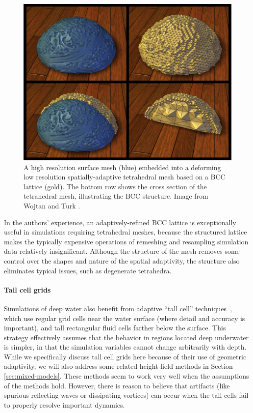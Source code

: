 \begin{figure}[t]
\centering
\includegraphics[width=\linewidth]{images/starAdaptivity-cgf2016/WT2008_BCC.png}
\caption{A high resolution surface mesh (blue) embedded into a deforming low resolution spatially-adaptive tetrahedral mesh based on a BCC lattice (gold). The bottom row shows the cross section of the tetrahedral mesh, illustrating the BCC structure. Image from Wojtan and Turk \cite{Wojtan2008}.}
\label{fig:WT_BCC}
\end{figure}

In the authors' experience, an adaptively-refined BCC lattice is exceptionally useful in simulations requiring tetrahedral meshes, because the structured lattice makes the typically expensive operations of remeshing and resampling simulation data relatively insignificant. Although the structure of the mesh removes some control over the shapes and nature of the spatial adaptivity, the structure also eliminates typical issues, such as degenerate tetrahedra.

\paragraph*{Tall cell grids} Simulations of deep water also benefit from adaptive ``tall cell'' techniques~\cite{Irving2006,Chentanez2011}, which use regular grid cells near the water surface (where detail and accuracy is important), and tall rectangular fluid cells farther below the surface. This strategy effectively assumes that the behavior in regions located deep underwater is simpler, in that the simulation variables cannot change arbitrarily with depth. While we specifically discuss tall cell grids here because of their use of geometric adaptivity, we will also address some related height-field methods in Section \ref{sec:mixed-models}. These methods seem to work very well when the assumptions of the methods hold. However, there is reason to believe that artifacts (like spurious reflecting waves or dissipating vortices) can occur when the tall cells fail to properly resolve important dynamics.

